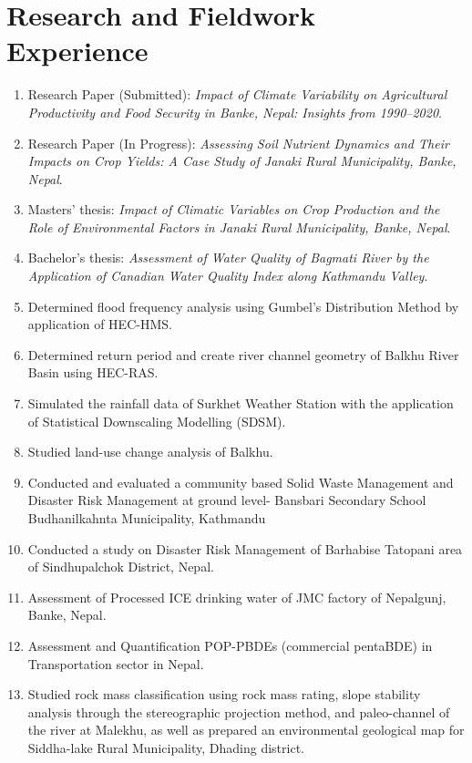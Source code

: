 \documentclass[a4paper,11.5pt]{article}
\begin{document}
\section{Research and Fieldwork Experience}
\begin{enumerate}
    \item Research Paper (Submitted): \textit{Impact of Climate Variability on Agricultural Productivity and Food Security in Banke, Nepal: Insights from 1990--2020}.
    \item Research Paper (In Progress): \textit{Assessing Soil Nutrient Dynamics and Their Impacts on Crop Yields: A Case Study of Janaki Rural Municipality, Banke, Nepal}.
    \item Masters’ thesis: \textit{Impact of Climatic Variables on Crop Production and the Role of Environmental Factors in Janaki Rural Municipality, Banke, Nepal}.
    \item Bachelor's thesis: \textit{Assessment of Water Quality of Bagmati River by the Application of Canadian Water Quality Index along Kathmandu Valley}.
    \item Determined flood frequency analysis using Gumbel’s Distribution Method by application of HEC-HMS.
    \item Determined return period and create river channel geometry of Balkhu River Basin using HEC-RAS.
    \item Simulated the rainfall data of Surkhet Weather Station with the application of Statistical Downscaling Modelling (SDSM).
    \item Studied land-use change analysis of Balkhu.
    \item Conducted and evaluated a community based Solid Waste Management and Disaster Risk Management at ground level- Bansbari Secondary School Budhanilkahnta Municipality, Kathmandu
    \item Conducted a study on Disaster Risk Management of Barhabise Tatopani area of Sindhupalchok District, Nepal.
    \item Assessment of Processed ICE drinking water of JMC factory
    of Nepalgunj, Banke, Nepal.
    \item Assessment and Quantification POP-PBDEs (commercial pentaBDE) in Transportation sector in Nepal.
    \item Studied rock mass classification using rock mass rating, slope stability analysis through the  stereographic projection method, and paleo-channel of the river at Malekhu, as well as prepared an environmental geological map for Siddha-lake Rural Municipality, Dhading district.

\end{enumerate}
\end{document}
